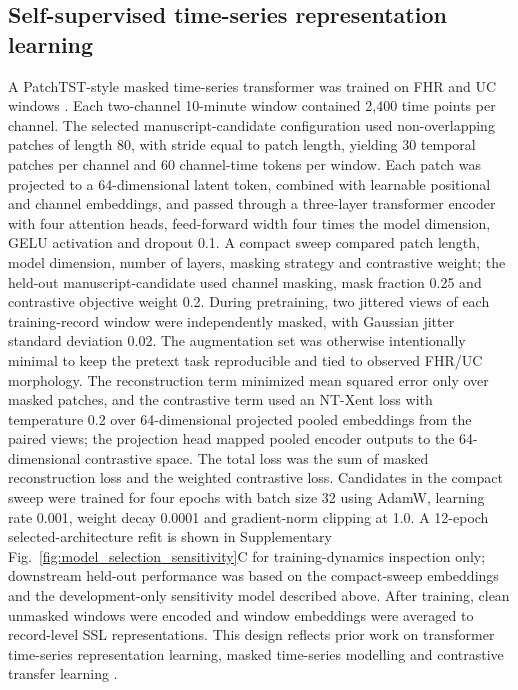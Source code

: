\documentclass[pdflatex,sn-nature]{sn-jnl}
\begin{document}
\subsection{Self-supervised time-series representation learning}

A PatchTST-style masked time-series transformer was trained on FHR and UC windows \cite{nie2023}. Each two-channel 10-minute window contained 2,400 time points per channel. The selected manuscript-candidate configuration used non-overlapping patches of length 80, with stride equal to patch length, yielding 30 temporal patches per channel and 60 channel-time tokens per window. Each patch was projected to a 64-dimensional latent token, combined with learnable positional and channel embeddings, and passed through a three-layer transformer encoder with four attention heads, feed-forward width four times the model dimension, GELU activation and dropout 0.1. A compact sweep compared patch length, model dimension, number of layers, masking strategy and contrastive weight; the held-out manuscript-candidate used channel masking, mask fraction 0.25 and contrastive objective weight 0.2. During pretraining, two jittered views of each training-record window were independently masked, with Gaussian jitter standard deviation 0.02. The augmentation set was otherwise intentionally minimal to keep the pretext task reproducible and tied to observed FHR/UC morphology. The reconstruction term minimized mean squared error only over masked patches, and the contrastive term used an NT-Xent loss with temperature 0.2 over 64-dimensional projected pooled embeddings from the paired views; the projection head mapped pooled encoder outputs to the 64-dimensional contrastive space. The total loss was the sum of masked reconstruction loss and the weighted contrastive loss. Candidates in the compact sweep were trained for four epochs with batch size 32 using AdamW, learning rate 0.001, weight decay 0.0001 and gradient-norm clipping at 1.0. A 12-epoch selected-architecture refit is shown in Supplementary Fig.~\ref{fig:model_selection_sensitivity}C for training-dynamics inspection only; downstream held-out performance was based on the compact-sweep embeddings and the development-only sensitivity model described above. After training, clean unmasked windows were encoded and window embeddings were averaged to record-level SSL representations. This design reflects prior work on transformer time-series representation learning, masked time-series modelling and contrastive transfer learning \cite{zerveas2021,nie2023,yue2022,zhang2022tfc,goswami2024moment}.
\end{document}
